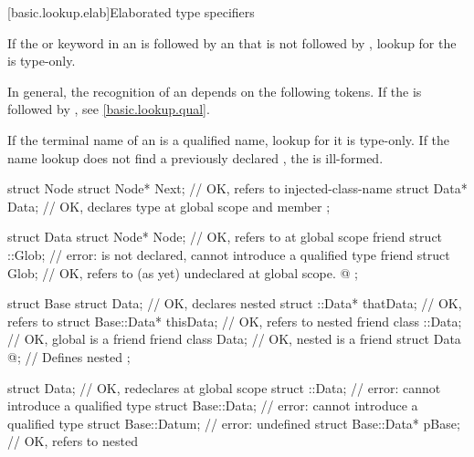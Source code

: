 %

[basic.lookup.elab]{Elaborated type specifiers}%
%

\pnum
If the  or  keyword
in an 
is followed by an 
that is not followed by \tcode{::},
lookup for the  is type-only.
\begin{note}
In general, the recognition of an 
depends on the following tokens.
If the  is followed by \tcode{::},
see \ref{basic.lookup.qual}.
\end{note}

\pnum
If the terminal name of an 
is a qualified name,
lookup for it is type-only.
If the name lookup does not find a previously declared ,
the  is ill-formed.

\pnum
\begin{example}
\begin{codeblock}
struct Node {
  struct Node* Next;            // OK, refers to injected-class-name 
  struct Data* Data;            // OK, declares type  at global scope and member 
};

struct Data {
  struct Node* Node;            // OK, refers to  at global scope
  friend struct ::Glob;         // error:  is not declared, cannot introduce a qualified type
  friend struct Glob;           // OK, refers to (as yet) undeclared  at global scope.
  @\commentellip@
};

struct Base {
  struct Data;                  // OK, declares nested 
  struct ::Data*     thatData;  // OK, refers to 
  struct Base::Data* thisData;  // OK, refers to nested 
  friend class ::Data;          // OK, global  is a friend
  friend class Data;            // OK, nested  is a friend
  struct Data { @\commentellip@ };    // Defines nested 
};

struct Data;                    // OK, redeclares  at global scope
struct ::Data;                  // error: cannot introduce a qualified type
struct Base::Data;              // error: cannot introduce a qualified type
struct Base::Datum;             // error:  undefined
struct Base::Data* pBase;       // OK, refers to nested 
\end{codeblock}
\end{example}
%

